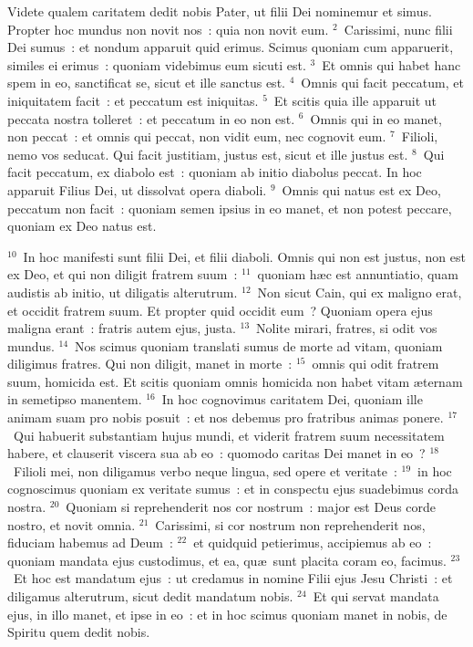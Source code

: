 \lettrine[lines=10,image=true,loversize=0.05,lraise=-0.03]{V}{}idete qualem caritatem dedit nobis Pater, ut filii Dei nominemur et simus. Propter hoc mundus non novit nos~: quia non novit eum.
${}^{2}$~Carissimi, nunc filii Dei sumus~: et nondum apparuit quid erimus. Scimus quoniam cum apparuerit, similes ei erimus~: quoniam videbimus eum sicuti est.
${}^{3}$~Et omnis qui habet hanc spem in eo, sanctificat se, sicut et ille sanctus est.
${}^{4}$~Omnis qui facit peccatum, et iniquitatem facit~: et peccatum est iniquitas.
${}^{5}$~Et scitis quia ille apparuit ut peccata nostra tolleret~: et peccatum in eo non est.
${}^{6}$~Omnis qui in eo manet, non peccat~: et omnis qui peccat, non vidit eum, nec cognovit eum.
${}^{7}$~Filioli, nemo vos seducat. Qui facit justitiam, justus est, sicut et ille justus est.
${}^{8}$~Qui facit peccatum, ex diabolo est~: quoniam ab initio diabolus peccat. In hoc apparuit Filius Dei, ut dissolvat opera diaboli.
${}^{9}$~Omnis qui natus est ex Deo, peccatum non facit~: quoniam semen ipsius in eo manet, et non potest peccare, quoniam ex Deo natus est.


${}^{10}$~In hoc manifesti sunt filii Dei, et filii diaboli. Omnis qui non est justus, non est ex Deo, et qui non diligit fratrem suum~:
${}^{11}$~quoniam h\ae c est annuntiatio, quam audistis ab initio, ut diligatis alterutrum.
${}^{12}$~Non sicut Cain, qui ex maligno erat, et occidit fratrem suum. Et propter quid occidit eum~? Quoniam opera ejus maligna erant~: fratris autem ejus, justa.
${}^{13}$~Nolite mirari, fratres, si odit vos mundus.
${}^{14}$~Nos scimus quoniam translati sumus de morte ad vitam, quoniam diligimus fratres. Qui non diligit, manet in morte~:
${}^{15}$~omnis qui odit fratrem suum, homicida est. Et scitis quoniam omnis homicida non habet vitam \ae ternam in semetipso manentem.
${}^{16}$~In hoc cognovimus caritatem Dei, quoniam ille animam suam pro nobis posuit~: et nos debemus pro fratribus animas ponere.
${}^{17}$~Qui habuerit substantiam hujus mundi, et viderit fratrem suum necessitatem habere, et clauserit viscera sua ab eo~: quomodo caritas Dei manet in eo~?
${}^{18}$~Filioli mei, non diligamus verbo neque lingua, sed opere et veritate~:
${}^{19}$~in hoc cognoscimus quoniam ex veritate sumus~: et in conspectu ejus suadebimus corda nostra.
${}^{20}$~Quoniam si reprehenderit nos cor nostrum~: major est Deus corde nostro, et novit omnia.
${}^{21}$~Carissimi, si cor nostrum non reprehenderit nos, fiduciam habemus ad Deum~:
${}^{22}$~et quidquid petierimus, accipiemus ab eo~: quoniam mandata ejus custodimus, et ea, qu\ae\ sunt placita coram eo, facimus.
${}^{23}$~Et hoc est mandatum ejus~: ut credamus in nomine Filii ejus Jesu Christi~: et diligamus alterutrum, sicut dedit mandatum nobis.
${}^{24}$~Et qui servat mandata ejus, in illo manet, et ipse in eo~: et in hoc scimus quoniam manet in nobis, de Spiritu quem dedit nobis.


